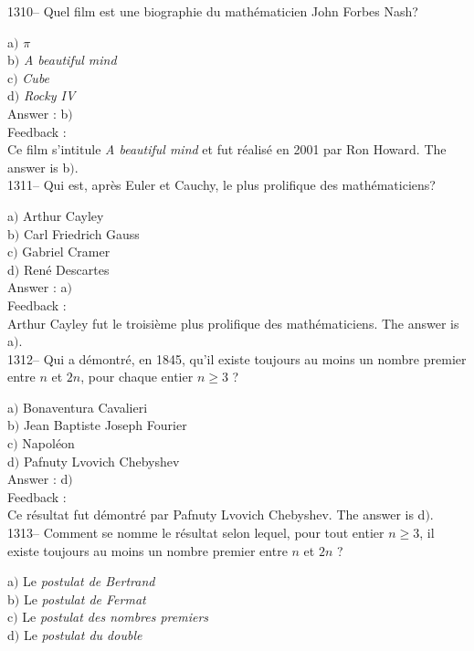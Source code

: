 ﻿\documentclass[letterpaper, 12pt]{article}
\begin{document}
1310-- Quel film est une biographie du math\'ematicien John Forbes
Nash?

a$)$ {\sl $\pi$} \\
b$)$ {\sl A beautiful mind} \\
c$)$ {\sl Cube}  \\
d$)$ {\sl Rocky IV}\\

Answer : b$)$\\

Feedback : \\
Ce film s'intitule {\sl A beautiful mind} et fut r\'ealis\'e en 2001
par Ron Howard.
The answer is  b$)$.\\

1311-- Qui est, apr\`es Euler et Cauchy, le plus prolifique des
math\'ematiciens?

a$)$ Arthur Cayley \\
b$)$ Carl Friedrich Gauss \\
c$)$ Gabriel Cramer  \\
d$)$ Ren\'e Descartes\\

Answer : a$)$\\

Feedback : \\
Arthur Cayley fut le troisi\`eme plus prolifique des
math\'ematiciens.
The answer is  a$)$.\\

1312-- Qui a d\'emontr\'e, en 1845, qu'il existe toujours au moins un nombre
premier entre $n$ et $2n$, pour
chaque entier $n\ge3$ ?

a$)$ Bonaventura Cavalieri \\
b$)$ Jean Baptiste Joseph Fourier \\
c$)$ Napol\'eon  \\
d$)$ Pafnuty Lvovich Chebyshev\\

Answer : d$)$\\

Feedback : \\
Ce r\'esultat fut d\'emontr\'e par Pafnuty Lvovich Chebyshev.
The answer is  d$)$.\\

1313-- Comment se nomme le r\'esultat selon lequel, pour tout entier
$n\ge3$, il existe toujours au moins un nombre premier entre $n$ et $2n$ ?

a$)$ Le {\sl postulat de Bertrand} \\
b$)$ Le {\sl postulat de Fermat} \\
c$)$ Le {\sl postulat des nombres premiers}  \\
d$)$ Le {\sl postulat du double}\\
\end{document}
